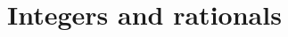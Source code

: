 \chapter{Integers and rationals} \label{ch 4}

\newcommand{\M}{\text{---}}
\newcommand{\D}{\text{//}}


